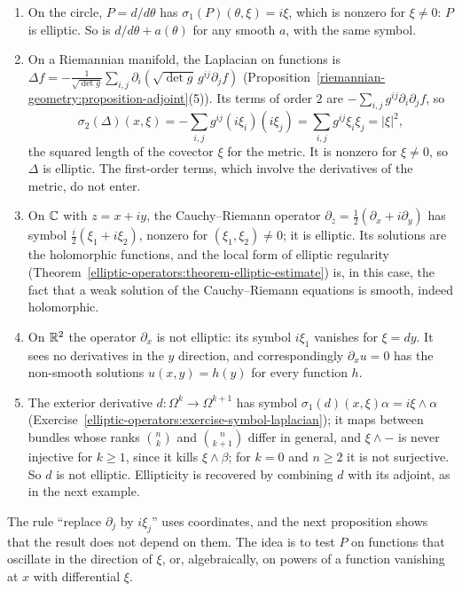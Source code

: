 \begin{example}\label{elliptic-operators:example-symbol-computations}
\begin{enumerate}
\item On the circle, $P = d/d\theta$ has $\sigma_1(P)(\theta, \xi) = i\xi$, which is nonzero for $\xi \neq 0$: $P$ is elliptic. So is $d/d\theta + a(\theta)$ for any smooth $a$, with the same symbol.
\item On a Riemannian manifold, the Laplacian on functions is $\Delta f = -\frac{1}{\sqrt{\det g}}\sum_{i,j}\partial_i(\sqrt{\det g}\,g^{ij}\partial_jf)$
(Proposition~\ref{riemannian-geometry:proposition-adjoint}(5)). Its terms of order $2$ are $-\sum_{i,j}g^{ij}\partial_i\partial_jf$, so
\[
\sigma_2(\Delta)(x, \xi) = -\sum_{i,j}g^{ij}(i\xi_i)(i\xi_j) = \sum_{i,j}g^{ij}\xi_i\xi_j = |\xi|^2,
\]
the squared length of the covector $\xi$ for the metric. It is nonzero for $\xi \neq 0$, so $\Delta$ is elliptic. The first-order terms, which involve the derivatives of the metric, do not enter.
\item On $\mathbb{C}$ with $z = x + iy$, the Cauchy--Riemann operator $\partial_{\bar z} = \frac12(\partial_x + i\partial_y)$ has symbol $\frac i2(\xi_1 + i\xi_2)$, nonzero for $(\xi_1, \xi_2) \neq 0$; it is elliptic. Its
solutions are the holomorphic functions, and the local form of elliptic regularity (Theorem~\ref{elliptic-operators:theorem-elliptic-estimate}) is, in this case, the fact that a weak solution of the
Cauchy--Riemann equations is smooth, indeed holomorphic.
\item On $\mathbb{R}^2$ the operator $\partial_x$ is not elliptic: its symbol $i\xi_1$ vanishes for $\xi = dy$. It sees no derivatives in the $y$ direction, and correspondingly $\partial_xu = 0$ has the
non-smooth solutions $u(x, y) = h(y)$ for every function $h$.
\item The exterior derivative $d \colon \Omega^k \to \Omega^{k+1}$ has symbol $\sigma_1(d)(x, \xi)\alpha = i\xi \wedge \alpha$ (Exercise~\ref{elliptic-operators:exercise-symbol-laplacian}); it maps between bundles
whose ranks $\binom nk$ and $\binom n{k+1}$ differ in general, and $\xi \wedge -$ is never injective for $k \geq 1$, since it kills $\xi \wedge \beta$; for $k = 0$ and $n \geq 2$ it is not surjective.
So $d$ is not elliptic. Ellipticity is recovered by combining $d$ with its adjoint, as in the next example.
\end{enumerate}
\end{example}

The rule ``replace $\partial_j$ by $i\xi_j$'' uses coordinates, and the next proposition shows that the result does not depend on them. The idea is to test $P$ on functions that oscillate in the
direction of $\xi$, or, algebraically, on powers of a function vanishing at $x$ with differential $\xi$.

